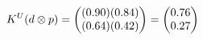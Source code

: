 \documentclass[preview]{standalone}
\begin{document}
\begin{align*}
\special{dvisvgm:raw <g id='unique000'>}K^U(d \otimes p) = \begin{pmatrix} (0.90)(0.84) \\ (0.64)(0.42) \end{pmatrix} = \begin{pmatrix} 0.76 \\ 0.27 \end{pmatrix}\special{dvisvgm:raw </g>}
\end{align*}
\end{document}
